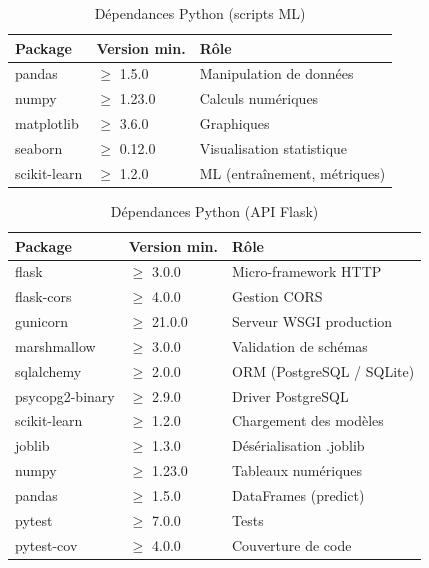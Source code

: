 \documentclass[12pt,a4paper,openany]{report}
\begin{document}
\begin{table}[H]
    \centering
    \caption{Dépendances Python (scripts ML)}
    \label{tab:deps-python-scripts}
    \begin{tabular}{l l l}
        \toprule
        \textbf{Package} & \textbf{Version min.} & \textbf{Rôle} \\
        \midrule
        pandas        & $\geq$ 1.5.0  & Manipulation de données \\
        numpy         & $\geq$ 1.23.0 & Calculs numériques \\
        matplotlib    & $\geq$ 3.6.0  & Graphiques \\
        seaborn       & $\geq$ 0.12.0 & Visualisation statistique \\
        scikit-learn  & $\geq$ 1.2.0  & ML (entraînement, métriques) \\
        \bottomrule
    \end{tabular}
\end{table}

\begin{table}[H]
    \centering
    \caption{Dépendances Python (API Flask)}
    \label{tab:deps-python-api}
    \begin{tabular}{l l l}
        \toprule
        \textbf{Package} & \textbf{Version min.} & \textbf{Rôle} \\
        \midrule
        flask            & $\geq$ 3.0.0  & Micro-framework HTTP \\
        flask-cors       & $\geq$ 4.0.0  & Gestion CORS \\
        gunicorn         & $\geq$ 21.0.0 & Serveur WSGI production \\
        marshmallow      & $\geq$ 3.0.0  & Validation de schémas \\
        sqlalchemy       & $\geq$ 2.0.0  & ORM (PostgreSQL / SQLite) \\
        psycopg2-binary  & $\geq$ 2.9.0  & Driver PostgreSQL \\
        scikit-learn     & $\geq$ 1.2.0  & Chargement des modèles \\
        joblib           & $\geq$ 1.3.0  & Désérialisation .joblib \\
        numpy            & $\geq$ 1.23.0 & Tableaux numériques \\
        pandas           & $\geq$ 1.5.0  & DataFrames (predict) \\
        pytest           & $\geq$ 7.0.0  & Tests \\
        pytest-cov       & $\geq$ 4.0.0  & Couverture de code \\
        \bottomrule
    \end{tabular}
\end{table}
\end{document}
